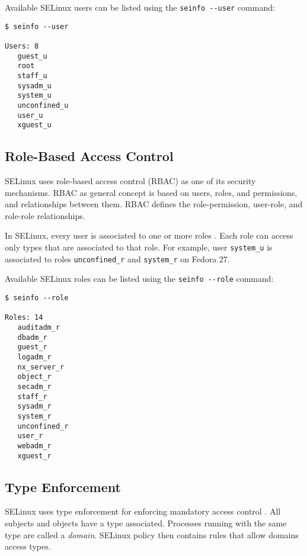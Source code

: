 Available SELinux users can be listed using the \texttt{seinfo -{}-user}
command:
\begin{lstlisting}
$ seinfo --user

Users: 8
   guest_u
   root
   staff_u
   sysadm_u
   system_u
   unconfined_u
   user_u
   xguest_u
\end{lstlisting}

\subsection{Role-Based Access Control}
\label{rbac}
SELinux uses role-based access control (RBAC) as one of its security mechanisms.
RBAC as general concept is based on users, roles, and permissions, and
relationships between them. RBAC defines the role-permission, user-role, and
role-role relationships.

In SELinux, every user is associated to one or more roles \cite[p.~24]{tsn}.
Each role can access only types that are associated to that role. For example,
user \texttt{system\_u} is associated to roles \texttt{unconfined\_r} and
\texttt{system\_r} on Fedora 27.

Available SELinux roles can be listed using the \texttt{seinfo -{}-role}
command:
\begin{lstlisting}
$ seinfo --role

Roles: 14
   auditadm_r
   dbadm_r
   guest_r
   logadm_r
   nx_server_r
   object_r
   secadm_r
   staff_r
   sysadm_r
   system_r
   unconfined_r
   user_r
   webadm_r
   xguest_r
\end{lstlisting}

\subsection{Type Enforcement}
\label{te}
SELinux uses type enforcement for enforcing mandatory access control
\cite[pp.~25--26]{tsn}. All subjects and objects have a type associated.
Processes running with the same type are called a \emph{domain}. SELinux
policy then contains rules that allow domains access types.

